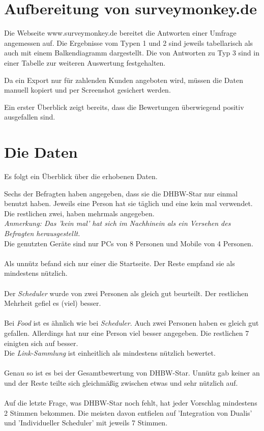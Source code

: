 \section{Aufbereitung von surveymonkey.de}
Die Webseite www.surveymonkey.de bereitet die Antworten einer Umfrage angemessen auf. Die Ergebnisse vom Typen 1 und 2 sind jeweils tabellarisch als auch mit einem Balkendiagramm dargestellt.
Die von Antworten zu Typ 3 sind in einer Tabelle zur weiteren Auswertung festgehalten.

Da ein Export nur für zahlenden Kunden angeboten wird, müssen die Daten manuell kopiert und per Screenshot gesichert werden.

Ein erster Überblick zeigt bereits, dass die Bewertungen überwiegend positiv ausgefallen sind.
\newpage
\section{Die Daten }
Es folgt ein Überblick über die erhobenen Daten.

Sechs der Befragten haben angegeben, dass sie die DHBW-Star nur einmal benutzt haben.
Jeweils eine Person hat sie täglich und eine kein mal verwendet.
Die restlichen zwei, haben mehrmals angegeben. \\
\emph{Anmerkung: Das 'kein mal' hat sich im Nachhinein als ein Versehen des Befragten herausgestellt. }
\\
Die genutzten Geräte sind nur PCs von 8 Personen und Mobile von 4 Personen. \\
\\
Als unnütz befand sich nur einer die Startseite. Der Reste empfand sie als mindestens nützlich. \\
\\
Der \emph{Scheduler} wurde von zwei Personen als gleich gut beurteilt. Der restlichen Mehrheit gefiel es (viel) besser. \\
\\
Bei \emph{Food} ist es ähnlich wie bei \emph{Scheduler}. Auch zwei Personen haben es gleich gut gefallen. Allerdings hat nur eine Person viel besser angegeben. Die restlichen 7 einigten sich auf besser.
\\
Die \emph{Link-Sammlung} ist einheitlich als mindestens nützlich bewertet. \\
\\
Genau so ist es bei der Gesamtbewertung von DHBW-Star. Unnütz gab keiner an und der Reste teilte sich gleichmäßig zwischen etwas und sehr nützlich auf. \\
\\
Auf die letzte Frage, was DHBW-Star noch fehlt, hat jeder Vorschlag mindestens 2 Stimmen bekommen. Die meisten davon entfielen auf 'Integration von Dualis' und 'Individueller Scheduler' mit jeweils 7 Stimmen.
\newpage
